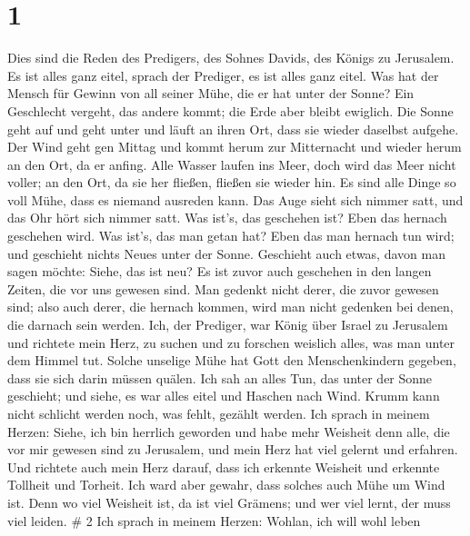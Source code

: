 \hypertarget{section}{%
\section{1}\label{section}}

 Dies sind die Reden des Predigers, des Sohnes Davids, des
Königs zu Jerusalem.  Es ist alles ganz eitel, sprach der
Prediger, es ist alles ganz eitel.  Was hat der Mensch für
Gewinn von all seiner Mühe, die er hat unter der Sonne?  Ein
Geschlecht vergeht, das andere kommt; die Erde aber bleibt ewiglich.
 Die Sonne geht auf und geht unter und läuft an ihren Ort,
dass sie wieder daselbst aufgehe.  Der Wind geht gen Mittag
und kommt herum zur Mitternacht und wieder herum an den Ort, da er
anfing.  Alle Wasser laufen ins Meer, doch wird das Meer
nicht voller; an den Ort, da sie her fließen, fließen sie wieder hin.
 Es sind alle Dinge so voll Mühe, dass es niemand ausreden
kann. Das Auge sieht sich nimmer satt, und das Ohr hört sich nimmer
satt.  Was ist's, das geschehen ist? Eben das hernach
geschehen wird. Was ist's, das man getan hat? Eben das man hernach tun
wird; und geschieht nichts Neues unter der Sonne. 
Geschieht auch etwas, davon man sagen möchte: Siehe, das ist neu? Es ist
zuvor auch geschehen in den langen Zeiten, die vor uns gewesen sind.
 Man gedenkt nicht derer, die zuvor gewesen sind; also auch
derer, die hernach kommen, wird man nicht gedenken bei denen, die
darnach sein werden.  Ich, der Prediger, war König über
Israel zu Jerusalem  und richtete mein Herz, zu suchen und
zu forschen weislich alles, was man unter dem Himmel tut. Solche
unselige Mühe hat Gott den Menschenkindern gegeben, dass sie sich darin
müssen quälen.  Ich sah an alles Tun, das unter der Sonne
geschieht; und siehe, es war alles eitel und Haschen nach Wind.
 Krumm kann nicht schlicht werden noch, was fehlt, gezählt
werden.  Ich sprach in meinem Herzen: Siehe, ich bin
herrlich geworden und habe mehr Weisheit denn alle, die vor mir gewesen
sind zu Jerusalem, und mein Herz hat viel gelernt und erfahren.
 Und richtete auch mein Herz darauf, dass ich erkennte
Weisheit und erkennte Tollheit und Torheit. Ich ward aber gewahr, dass
solches auch Mühe um Wind ist.  Denn wo viel Weisheit ist,
da ist viel Grämens; und wer viel lernt, der muss viel leiden. \# 2
 Ich sprach in meinem Herzen: Wohlan, ich will wohl leben
